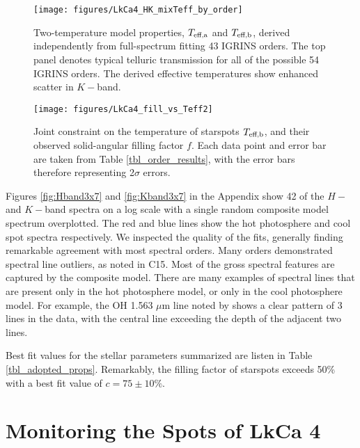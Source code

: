 \documentclass[twocolumn]{emulateapj}%
\newcommand{\iancze}{{\sc C15}}
\begin{document}


\begin{figure*}
	\centering
	\texttt{[image: figures/LkCa4\_HK\_mixTeff\_by\_order]} 
	\caption{Two-temperature model properties, $T_\textrm{eff,a}$ and $T_\textrm{eff,b}$, derived independently from full-spectrum fitting 43 IGRINS orders.  The top panel denotes typical telluric transmission for all of the possible 54 IGRINS orders.  The derived effective temperatures show enhanced scatter in $K-$band.}
	\label{fig:TwoTempResults}
\end{figure*}



\begin{figure*}
	\centering
	\texttt{[image: figures/LkCa4\_fill\_vs\_Teff2]} 
	\caption{Joint constraint on the temperature of starspots $T_\textrm{eff,b}$, and their observed solid-angular filling factor $f$.  Each data point and error bar are taken from Table \ref{tbl_order_results}, with the error bars therefore representing 2$\sigma$ errors.}
	\label{fig:TwoTempResults}
\end{figure*}

Figures \ref{fig:Hband3x7} and \ref{fig:Kband3x7} in the Appendix show 42 of the $H-$ and $K-$band spectra on a log scale with a single random composite model spectrum overplotted.  The red and blue lines show the hot photosphere and cool spot spectra respectively.  We inspected the quality of the fits, generally finding remarkable agreement with most spectral orders.  Many orders demonstrated spectral line outliers, as noted in \iancze.  Most of the gross spectral features are captured by the composite model.  There are many examples of spectral lines that are present only in the hot photosphere model, or only in the cool photosphere model.  For example, the OH 1.563 $\mu$m line noted by \citet{oneal01} shows a clear pattern of 3 lines in the data, with the central line exceeding the depth of the adjacent two lines.  

Best fit values for the stellar parameters summarized are listen in Table \ref{tbl_adopted_props}.  Remarkably, the filling factor of starspots exceeds 50\% with a best fit value of $c=75\pm 10 \% $.





\section{Monitoring the Spots of LkCa 4}
\end{document}
